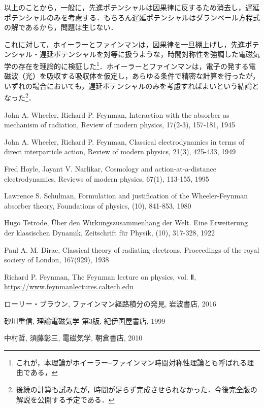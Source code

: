 \documentclass[10pt, a5paper, twoside]{jsarticle}
\theoremstyle{definition}
\begin{document}
		以上のことから，一般に，先進ポテンシャルは因果律に反するため消去し，遅延ポテンシャルのみを考慮する．もちろん遅延ポテンシャルはダランベール方程式の解であるから，問題は生じない．

		これに対して，ホイーラーとファインマンは，因果律を一旦棚上げし，先進ポテンシャル・遅延ポテンシャルを対等に扱うような，時間対称性を強調した電磁気学の存在を理論的に検証した\footnote{これが，本理論がホイーラー--ファインマン時間対称性理論とも呼ばれる理由である，}．ホイーラーとファインマンは，電子の発する電磁波（光）を吸収する吸収体を仮定し，あらゆる条件で精密な計算を行ったが，いずれの場合においても，遅延ポテンシャルのみを考慮すればよいという結論となった\footnote{後続の計算も試みたが，時間が足らず完成させられなかった．今後完全版の解説を公開する予定である．}．

	\clearpage

	\begin{thebibliography}{99}

		 John A. Wheeler, Richard P. Feynman, Interaction with the absorber as mechanism of radiation, Review of modern physics, 17(2-3), 157-181, 1945

		 John A. Wheeler, Richard P. Feynman, Classical electrodynamics in terms of direct interparticle action, Review of modern physics, 21(3), 425-433, 1949

		 Fred Hoyle, Jayant V. Narlikar, Cosmology and action-at-a-distance electrodynamics, Reviews of modern physics, 67(1), 113-155, 1995
		
		 Lawrence S. Schulman, Formulation and justification of the Wheeler-Feynman absorber theory, Foundations of physics, (10), 841-853, 1980
		
		 Hugo Tetrode, Über den Wirkungszusammenhang der Welt. Eine Erweiterung der klassischen Dynamik, Zeitschrift für Physik, (10), 317-328, 1922
		
		 Paul A. M. Dirac, Classical theory of radiating electrons, Proceedings of the royal society of London, 167(929), 1938
		
		 Richard P. Feynman, The Feynman lecture on physics, vol. Ⅱ, \url{https://www.feynmanlectures.caltech.edu}
		
		 ローリー・ブラウン, ファインマン経路積分の発見, 岩波書店, 2016
		
		 砂川重信, 理論電磁気学 第3版, 紀伊国屋書店, 1999
		
		 中村哲, 須藤彰三, 電磁気学, 朝倉書店, 2010

	\end{thebibliography}
\end{document}
